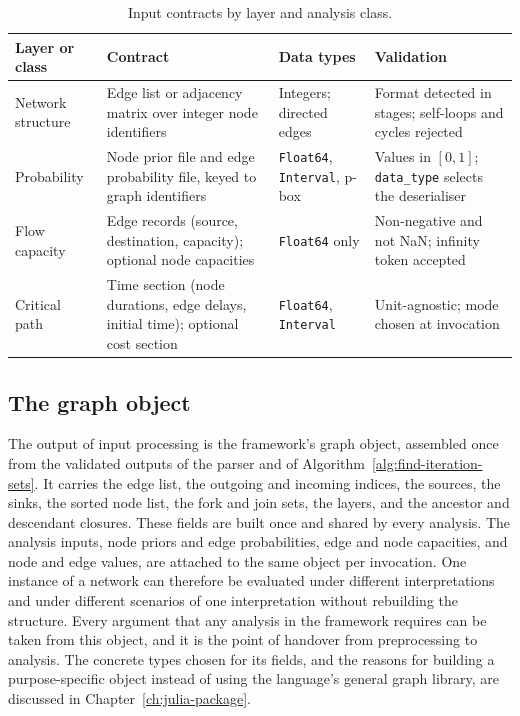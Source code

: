 \documentclass[12pt]{report}
\begin{document}
\begin{table}[htbp]
\centering
\caption{Input contracts by layer and analysis class.}
\label{tab:input-processing-contracts}
\small
\renewcommand{\arraystretch}{1.15}
\begin{tabular}{p{}p{}p{}p{}}
\toprule
Layer or class & Contract & Data types & Validation \\
\midrule
Network structure & Edge list or adjacency matrix over integer node identifiers &
  Integers; directed edges & Format detected in stages; self-loops and cycles rejected \\
Probability & Node prior file and edge probability file, keyed to graph identifiers &
  \texttt{Float64}, \texttt{Interval}, p-box & Values in $[0,1]$; \texttt{data\_type}
  selects the deserialiser \\
Flow capacity & Edge records (source, destination, capacity); optional node capacities &
  \texttt{Float64} only & Non-negative and not NaN; infinity token accepted \\
Critical path & Time section (node durations, edge delays, initial time); optional cost
  section & \texttt{Float64}, \texttt{Interval} & Unit-agnostic; mode chosen at
  invocation \\
\bottomrule
\end{tabular}
\end{table}

\subsection{The graph object}
\label{sec:model-input-object}

The output of input processing is the framework's graph object, assembled once from the
validated outputs of the parser and of Algorithm~\ref{alg:find-iteration-sets}. It carries the
edge list, the outgoing and incoming indices, the sources, the sinks, the sorted node list, the
fork and join sets, the layers, and the ancestor and descendant closures. These fields are
built once and shared by every analysis. The analysis inputs, node priors and edge
probabilities, edge and node capacities, and node and edge values, are attached to the same
object per invocation. One instance of a network can therefore be evaluated under different
interpretations and under different scenarios of one interpretation without rebuilding the
structure. Every argument that any analysis in the framework requires can be taken from this
object, and it is
the point of handover from preprocessing to analysis. The concrete types chosen for its fields,
and the reasons for building a purpose-specific object instead of using the language's
general graph library, are discussed in Chapter~\ref{ch:julia-package}.
\end{document}
